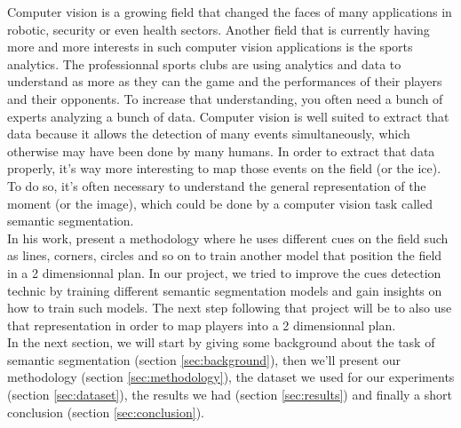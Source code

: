 Computer vision is a growing field that changed the faces of many applications in robotic, security or even health sectors. Another field that is currently having more and more interests in such computer vision applications is the sports analytics. The professionnal sports clubs are using analytics and data to understand as more as they can the game and the performances of their players and their opponents. To increase that understanding, you often need a bunch of experts analyzing a bunch of data. Computer vision is well suited to extract that data because it allows the detection of many events simultaneously, which otherwise may have been done by many humans. In order to extract that data properly, it's way more interesting to map those events on the field (or the ice). To do so, it's often necessary to understand the general representation of the moment (or the image), which could be done by a computer vision task called semantic segmentation.
\\
In his work, \cite{Homayounfar} present a methodology where he uses different cues on the field such as lines, corners, circles and so on to train another model that position the field in a 2 dimensionnal plan. In our project, we tried to improve the cues detection technic by training different semantic segmentation models and gain insights on how to train such models. The next step following that project will be to also use that representation in order to map players into a 2 dimensionnal plan.
\\
In the next section, we will start by giving some background about the task of semantic segmentation (section \ref{sec:background}), then we'll present our methodology (section \ref{sec:methodology}), the dataset we used for our experiments (section \ref{sec:dataset}), the results we had (section \ref{sec:results}) and finally a short conclusion (section \ref{sec:conclusion}).
 